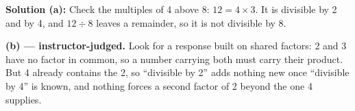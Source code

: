 \documentclass[12pt]{article}
\begin{document}

\textbf{Solution (a):} Check the multiples of 4 above 8: $12 = 4 \times 3$. It is divisible by 2 and by 4, and $12 \div 8$ leaves a remainder, so it is not divisible by 8. 

\textbf{(b) --- instructor-judged.} Look for a response built on shared factors: 2 and 3 have no factor in common, so a number carrying both must carry their product. But 4 already contains the 2, so ``divisible by 2'' adds nothing new once ``divisible by 4'' is known, and nothing forces a second factor of 2 beyond the one 4 supplies.
\end{document}
